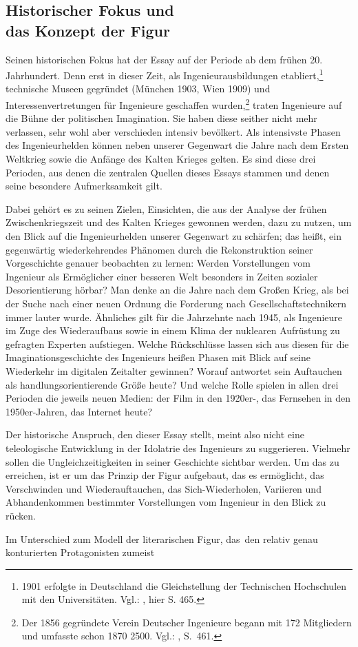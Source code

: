 \documentclass[%
	fontsize=10pt,%
	twoside,%
	headings=optiontoheadandtoc,%
	showtrims]{scrbook}
\renewcommand{\texttt}{\nohyphens} %
\begin{document}
\subsection[Historischer Fokus und    das Konzept der Figur]{Historischer Fokus und \- \protect\\ das Konzept der Figur}
\par Seinen historischen Fokus hat der Essay auf der Periode ab dem frühen 20. Jahrhundert. Denn erst in dieser Zeit, als Ingenieurausbildungen etabliert,\footnote{1901 erfolgte in Deutschland die Gleichstellung der Technischen Hochschulen mit den Universitäten. Vgl.: \cite[][]{treue1967a}, hier S. 465.}  technische Museen gegründet (München 1903, Wien 1909) und Interessenvertretungen für Ingenieure geschaffen wurden,\footnote{Der 1856 gegründete Verein Deutscher Ingenieure begann mit 172 Mitgliedern und umfasste schon 1870 2500. Vgl.: \cite[][]{treue1967a}, \texttt{S.~461.}}  traten Ingenieure auf die Bühne der politischen Imagination. Sie haben diese seither nicht mehr verlassen, sehr wohl aber verschieden intensiv bevölkert. Als intensivste Phasen des Ingenieurhelden können neben unserer Gegenwart die Jahre nach dem Ersten Weltkrieg sowie die Anfänge des Kalten Krieges gelten. Es sind diese drei Perioden, aus denen die zentralen Quellen dieses Essays stammen und denen seine besondere Aufmerksamkeit gilt.\par Dabei gehört es zu seinen Zielen, Einsichten, die aus der Analyse der frühen Zwischenkriegszeit und des Kalten Krieges gewonnen werden, dazu zu nutzen, um den Blick auf die Ingenieurhelden unserer Gegenwart zu schärfen; das heißt, ein gegenwärtig wiederkehrendes Phänomen durch die Rekonstruktion seiner Vorgeschichte genauer beobachten zu lernen: Werden Vorstellungen vom Ingenieur als Ermöglicher einer besseren Welt besonders in Zeiten sozialer Desorientierung hörbar? Man denke an die Jahre nach dem Großen Krieg, als bei der Suche nach einer neuen Ordnung die Forderung nach Gesellschaftstechnikern immer lauter wurde. Ähnliches gilt für die Jahrzehnte nach 1945, als Ingenieure im Zuge des Wiederaufbaus sowie in einem Klima der nuklearen Aufrüstung zu gefragten Experten aufstiegen. Welche Rückschlüsse lassen sich aus diesen für die Imaginationsgeschichte des Ingenieurs heißen Phasen mit Blick auf seine Wiederkehr im digitalen Zeitalter gewinnen? Worauf antwortet sein Auftauchen als handlungsorientierende Größe heute? Und welche Rolle spielen in allen drei Perioden die jeweils neuen Medien: der Film in den 1920er-, das Fernsehen in den 1950er-Jahren, das Internet heute?\par Der historische Anspruch, den dieser Essay stellt, meint also nicht eine teleologische Entwicklung in der Idolatrie des Ingenieurs zu suggerieren. Vielmehr sollen die Ungleichzeitigkeiten in seiner Geschichte sichtbar werden. Um das zu erreichen, ist er um das Prinzip der Figur aufgebaut, das es ermöglicht, das Verschwinden und Wiederauftauchen, das Sich-Wiederholen, Variieren und Abhandenkommen bestimmter Vorstellungen vom Ingenieur in den Blick zu rücken.\par Im Unterschied zum Modell der literarischen Figur, \texttt{das~den} relativ genau konturierten Protagonisten zumeist 
\end{document}
